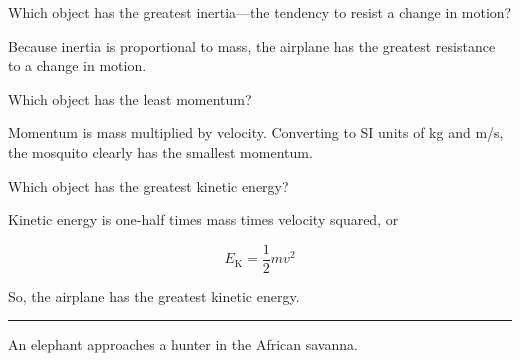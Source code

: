 \documentclass[dvipsnames]{exam}
\begin{document}
\begin{questions}
\question \label{Ui9uc}
Which object has the greatest inertia---the tendency to resist a change in motion?

\begin{solution}
    Because inertia is proportional to mass, the airplane has the greatest resistance to a change in motion.
\end{solution}

\question
Which object has the least momentum?

\begin{solution}
    Momentum is mass multiplied by velocity. Converting to SI units of kg and m/s, the mosquito clearly has the smallest momentum.
\end{solution}

\question \label{NuukR}
Which object has the greatest kinetic energy?

\begin{solution}
    Kinetic energy is one-half times mass times velocity squared, or

    \begin{equation*}
        E_\mathrm{K} = \frac{1}{2} m v^2
    \end{equation*}

    So, the airplane has the greatest kinetic energy.
\end{solution}

\bigskip
\hrule

\question \label{openstax-8.1}
An elephant approaches a hunter in the African savanna.

\begin{center}
\end{center}


\end{questions}
\end{document}
